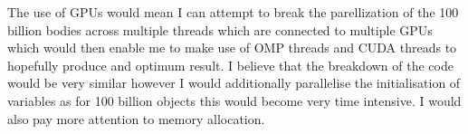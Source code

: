 \documentclass[a4paper, twoside, 11pt]{article}
\begin{document}
The use of GPUs would mean I can attempt to break the parellization of the 100 billion bodies across multiple threads which are connected to multiple GPUs which would then enable me to make use of OMP threads and CUDA threads to hopefully produce and optimum result. I believe that the breakdown of the code would be very similar however I would additionally parallelise the initialisation of variables as for 100 billion objects this would become very time intensive. I would also pay more attention to memory allocation.
\end{document}
